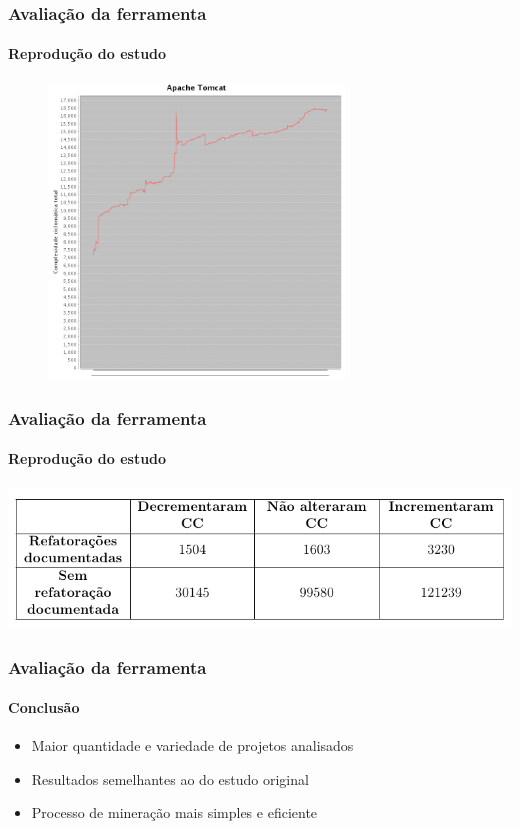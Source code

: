\documentclass[brazil]{beamer}
\begin{document}
	\begin{frame}
		\frametitle{Avaliação da ferramenta}
		\framesubtitle{Reprodução do estudo}
		\begin{figure}[ht]
		\centering
		\includegraphics[width=0.7\textwidth]{img/tomcat.png}
		\end{figure}
	\end{frame}

	\begin{frame}
		\frametitle{Avaliação da ferramenta}
		\framesubtitle{Reprodução do estudo}
		\includegraphics[width=1.00\textwidth]{img/tabela-metricminer.png}
	\end{frame}

	\begin{frame}
		\frametitle{Avaliação da ferramenta}
		\framesubtitle{Conclusão}
		\begin{itemize}
			\item Maior quantidade e variedade de projetos analisados
			\item Resultados semelhantes ao do estudo original
			\item Processo de mineração mais simples e eficiente
		\end{itemize}
	\end{frame}
\end{document}
